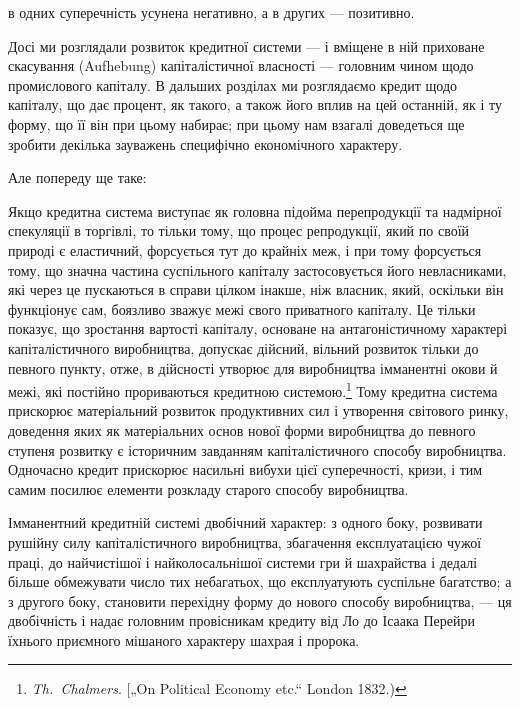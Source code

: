 \parcont{}  %
в одних суперечність усунена негативно, а в других — позитивно.

Досі ми розглядали розвиток кредитної системи — і вміщене
в ній приховане скасування (Aufhebung) капіталістичної власності — головним чином щодо промислового
капіталу. В дальших розділах ми розглядаємо кредит щодо капіталу, що дає процент, як
такого, а також його вплив на цей останній, як і ту форму, що
її він при цьому набирає; при цьому нам взагалі доведеться ще
зробити декілька зауважень специфічно економічного характеру.

Але попереду ще таке:

Якщо кредитна система виступає як головна підойма перепродукції та надмірної спекуляції в торгівлі,
то тільки тому,
що процес репродукції, який по своїй природі є еластичний,
форсується тут до крайніх меж, і при тому форсується тому,
що значна частина суспільного капіталу застосовується його
невласниками, які через це пускаються в справи цілком інакше,
ніж власник, який, оскільки він функціонує сам, боязливо зважує
межі свого приватного капіталу. Це тільки показує, що зростання вартості капіталу, основане на
антагоністичному характері
капіталістичного виробництва, допускає дійсний, вільний розвиток тільки до певного пункту, отже, в
дійсності утворює для виробництва імманентні окови й межі, які постійно прориваються
кредитною системою.\footnote{
\emph{Th.~Chalmers}. [„On Political Economy etc.“ London 1832.)
} Тому кредитна система прискорює матеріальний розвиток продуктивних сил і
утворення світового ринку,
доведення яких як матеріальних основ нової форми виробництва
до певного ступеня розвитку є історичним завданням капіталістичного способу виробництва. Одночасно
кредит прискорює насильні вибухи цієї суперечності, кризи, і тим самим посилює елементи розкладу
старого способу виробництва.

Імманентний кредитній системі двобічний характер: з одного
боку, розвивати рушійну силу капіталістичного виробництва,
збагачення експлуатацією чужої праці, до найчистішої і найколосальнішої системи гри й шахрайства і
дедалі більше обмежувати число тих небагатьох, що експлуатують суспільне багатство; а з другого
боку, становити перехідну форму до нового
способу виробництва, — ця двобічність і надає головним провісникам кредиту від Ло до Ісаака Перейри
їхнього приємного мішаного характеру шахрая і пророка.
